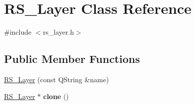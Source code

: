 \hypertarget{classRS__Layer}{\section{R\-S\-\_\-\-Layer Class Reference}
\label{classRS__Layer}
}


{\ttfamily \#include $<$rs\-\_\-layer.\-h$>$}

\subsection*{Public Member Functions}
\begin{DoxyCompactItemize}
\item 
\hyperlink{classRS__Layer_a2662ad95414337e3fe462aa50b7ee367}{R\-S\-\_\-\-Layer} (const Q\-String \&name)
\item 
\hypertarget{classRS__Layer_ad3ae3c4541f7d0024d5a00203c4d92be}{\hyperlink{classRS__Layer}{R\-S\-\_\-\-Layer} $\ast$ {\bfseries clone} ()}\label{classRS__Layer_ad3ae3c4541f7d0024d5a00203c4d92be}


\end{DoxyCompactItemize}
